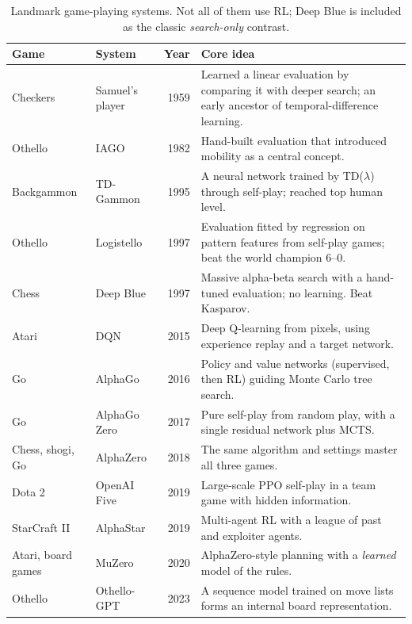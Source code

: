\documentclass[11pt]{article}
\begin{document}
\begin{table}[H]
\centering
\caption{Landmark game-playing systems. Not all of them use RL; Deep Blue is
included as the classic \emph{search-only} contrast.}
\label{tab:landmarks}
\small
\begin{tabularx}{\linewidth}{@{}llrX@{}}
\toprule
Game & System & Year & Core idea \\
\midrule
Checkers & Samuel's player \cite{samuel1959} & 1959 & Learned a linear evaluation by comparing it with deeper search; an early ancestor of temporal-difference learning. \\
Othello & IAGO \cite{rosenbloom1982} & 1982 & Hand-built evaluation that introduced mobility as a central concept. \\
Backgammon & TD-Gammon \cite{tesauro1995} & 1995 & A neural network trained by TD($\lambda$) through self-play; reached top human level. \\
Othello & Logistello \cite{buro1995,buro1997} & 1997 & Evaluation fitted by regression on pattern features from self-play games; beat the world champion 6--0. \\
Chess & Deep Blue \cite{campbell2002} & 1997 & Massive alpha-beta search with a hand-tuned evaluation; no learning. Beat Kasparov. \\
Atari & DQN \cite{mnih2015} & 2015 & Deep Q-learning from pixels, using experience replay and a target network. \\
Go & AlphaGo \cite{silver2016} & 2016 & Policy and value networks (supervised, then RL) guiding Monte Carlo tree search. \\
Go & AlphaGo Zero \cite{silver2017} & 2017 & Pure self-play from random play, with a single residual network plus MCTS. \\
Chess, shogi, Go & AlphaZero \cite{silver2018} & 2018 & The same algorithm and settings master all three games. \\
Dota 2 & OpenAI Five \cite{berner2019} & 2019 & Large-scale PPO self-play in a team game with hidden information. \\
StarCraft II & AlphaStar \cite{vinyals2019} & 2019 & Multi-agent RL with a league of past and exploiter agents. \\
Atari, board games & MuZero \cite{schrittwieser2020} & 2020 & AlphaZero-style planning with a \emph{learned} model of the rules. \\
Othello & Othello-GPT \cite{li2023} & 2023 & A sequence model trained on move lists forms an internal board representation. \\
\bottomrule
\end{tabularx}
\end{table}
\end{document}
